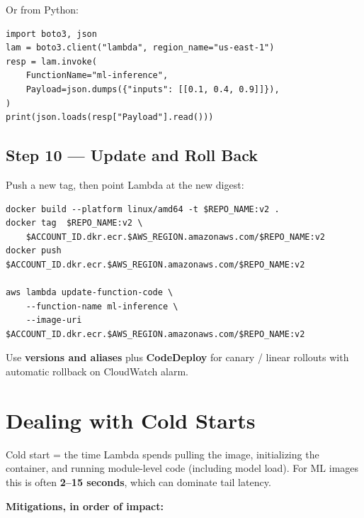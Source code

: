 \documentclass[11pt,a4paper]{article}
\begin{document}
Or from Python:

\begin{lstlisting}[style=pycode]
import boto3, json
lam = boto3.client("lambda", region_name="us-east-1")
resp = lam.invoke(
    FunctionName="ml-inference",
    Payload=json.dumps({"inputs": [[0.1, 0.4, 0.9]]}),
)
print(json.loads(resp["Payload"].read()))
\end{lstlisting}

\subsection{Step 10 --- Update and Roll Back}

Push a new tag, then point Lambda at the new digest:

\begin{lstlisting}[style=bashcode]
docker build --platform linux/amd64 -t $REPO_NAME:v2 .
docker tag  $REPO_NAME:v2 \
    $ACCOUNT_ID.dkr.ecr.$AWS_REGION.amazonaws.com/$REPO_NAME:v2
docker push $ACCOUNT_ID.dkr.ecr.$AWS_REGION.amazonaws.com/$REPO_NAME:v2

aws lambda update-function-code \
    --function-name ml-inference \
    --image-uri $ACCOUNT_ID.dkr.ecr.$AWS_REGION.amazonaws.com/$REPO_NAME:v2
\end{lstlisting}

Use \textbf{versions and aliases} plus \textbf{CodeDeploy} for canary / linear
rollouts with automatic rollback on CloudWatch alarm.

\section{Dealing with Cold Starts}

Cold start = the time Lambda spends pulling the image, initializing the
container, and running module-level code (including model load). For ML images
this is often \textbf{2--15 seconds}, which can dominate tail latency.

\textbf{Mitigations, in order of impact:}
\end{document}
